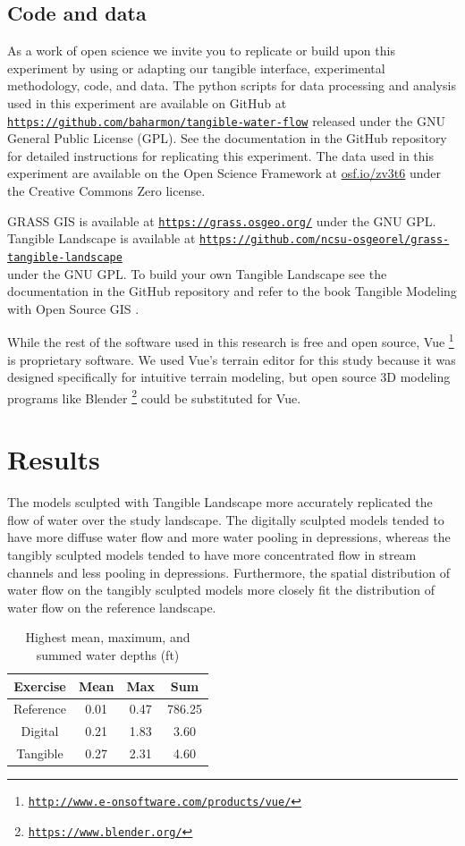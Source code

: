 \documentclass{isprs}
\newcommand{\urlhttp}[1]{\href{http://#1}{\nolinkurl{#1}}}
\newcommand{\urlhttps}[1]{\href{https://#1}{\nolinkurl{#1}}}
\begin{document}
\subsection{Code and data}

As a work of open science we invite you to
replicate or build upon this experiment by 
using or adapting our tangible interface, experimental methodology, code, and data. 
%
The python scripts for data processing and analysis used in this experiment 
are available on GitHub at 
\urlhttps{https://github.com/baharmon/tangible-water-flow}
released under the GNU General Public License (GPL). 
%
See the documentation in the GitHub repository for detailed instructions for replicating this experiment. 
%
The data used in this experiment are available on the Open Science Framework at \url{osf.io/zv3t6} under the Creative Commons Zero license.

GRASS GIS is available at
\urlhttps{https://grass.osgeo.org/} 
under the GNU GPL. 
%
Tangible Landscape is available at
\urlhttps{https://github.com/ncsu-osgeorel/grass-tangible-landscape} \\
under the GNU GPL. 
%
To build your own Tangible Landscape
see the documentation in the GitHub repository 
and refer to the book Tangible Modeling with Open Source GIS \cite{Petrasova2015}.

While the rest of the software used in this research is free and open source, 
Vue \footnote{\urlhttp{http://www.e-onsoftware.com/products/vue/}} is proprietary software. 
We used Vue's terrain editor for this study because it was designed specifically for intuitive terrain modeling, but 
open source 3D modeling programs like Blender \footnote{\urlhttps{https://www.blender.org/}} could be substituted for Vue. 
%

\section{Results}\label{sec:results}
%
The models sculpted with Tangible Landscape more accurately replicated the flow of water over the study landscape. 
%
The digitally sculpted models tended to have 
more diffuse water flow
and more water pooling in depressions, whereas 
%
the tangibly sculpted models tended to have 
more concentrated flow in stream channels
and less pooling in depressions.
%
Furthermore, 
the spatial distribution of water flow on the tangibly sculpted models 
more closely fit the distribution of water flow on the reference landscape. 

\begin{table}[h!]
\centering
\begin{tabular}{c c c c}
\toprule
Exercise & Mean & Max & Sum\\
\midrule
Reference & 0.01 & 0.47 & 786.25\\
Digital & 0.21 & 1.83 & 3.60\\
Tangible & 0.27 & 2.31 & 4.60\\ 
\bottomrule
\end{tabular}
\vspace*{0.5em}
\caption{Highest mean, maximum, and summed water depths (ft)}
\label{table:water_depth} 
\end{table}
\end{document}
